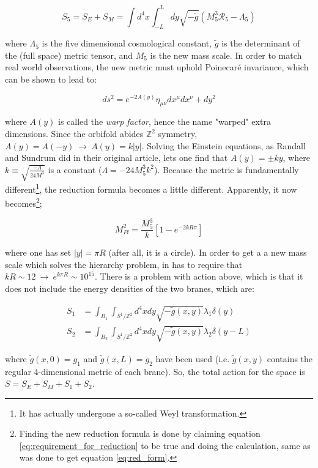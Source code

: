 \documentclass[11pt,a4paper]{article}
\begin{document}
\begin{equation}
	S_5 = S_E + S_M = \int d^4x \int_{-L}^{L} dy \sqrt{-\tilde{g}}(M_5^3\mathcal{R}_5 - \Lambda_5)
\end{equation}

where $\Lambda_5$ is the five dimensional cosmological constant, $\tilde{g}$ is the determinant of the (full space) metric tensor, and $M_5$ is the new mass scale. In order to match real world observations, the new metric must uphold Poinecaré invariance, which can be shown to lead to:

\begin{equation}
	ds^2 = e^{-2A(y)}\eta_{\mu\nu}dx^\mu dx^\nu + dy^2
	\label{eq:RS_lineelement}
\end{equation}

where $A(y)$ is called the \emph{warp factor}, hence the name "warped" extra dimensions. Since the orbifold abides $\mathbb{Z}^2$ symmetry, $A(y) = A(-y) \:\rightarrow\: A(y) = k|y|$. Solving the Einstein equations, as Randall and Sundrum did in their original article, lets one find that $A(y) = \pm ky$, where $k \equiv \sqrt{\frac{-\Lambda}{24M^3}}$ is a constant ($\Lambda = -24M_5^3k^2$). Because the metric is fundamentally different\footnote{It has actually undergone a so-called Weyl transformation.}, the reduction formula becomes a little different. Apparently, it now becomes\footnote{Finding the new reduction formula is done by claiming equation \ref{eq:requirement_for_reduction} to be true and doing the calculation, same as was done to get equation \ref{eq:red_form}.};

\begin{equation}
	M_{Pl}^2 = \frac{M_5^3}{k}\left[ 1-e^{-2kR\pi} \right]
\end{equation}

where one has set $|y| = \pi R$ (after all, it is a circle). In order to get a a new mass scale which solves the hierarchy problem, in has to require that $kR \sim 12 \:\rightarrow\: e^{k\pi R} \sim 10^{15}$. There is a problem with action above, which is that it does not include the energy densities of the two branes, which are:

\begin{align}
	S_1 &= \int_{B_1}\int_{S^1/\mathbb{Z}^2}d^4xdy \sqrt{-\tilde{g}(x,y)}\lambda_1\delta(y)\\
	S_2 &= \int_{B_2}\int_{S^1/\mathbb{Z}^2}d^4xdy \sqrt{-\tilde{g}(x,y)}\lambda_2\delta(y-L)
\end{align}

where $\tilde{g}(x,0) = g_1$ and $\tilde{g}(x,L) = g_2$ have been used (i.e. $\tilde{g}(x,y)$ contains the regular 4-dimensional metric of each brane). So, the total action for the space is $S = S_E+S_M+S_1+S_2$. 
\end{document}

